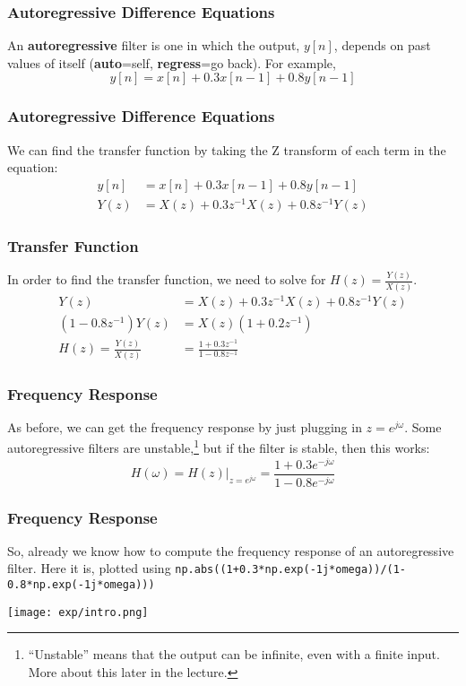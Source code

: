 \documentclass{beamer}
\begin{document}
\begin{frame}
  \frametitle{Autoregressive Difference Equations}

  An {\bf autoregressive} filter is one in which the output, $y[n]$,
  depends on past values of itself ({\bf auto}=self, {\bf
    regress}=go back).  For example,
  \[
  y[n] = x[n] + 0.3x[n-1] + 0.8 y[n-1]
  \]
  
\end{frame}

\begin{frame}
  \frametitle{Autoregressive Difference Equations}

  We can find the transfer function by taking the Z transform of each term
  in the equation:
  \begin{align*}
    y[n] &= x[n] + 0.3 x[n-1] +  0.8 y[n-1]\\
    Y(z) &= X(z) + 0.3z^{-1}X(z) + 0.8  z^{-1}Y(z)
  \end{align*}
  
\end{frame}

\begin{frame}
  \frametitle{Transfer Function}

  In order to find the transfer function, we need to solve for
  $H(z)=\frac{Y(z)}{X(z)}$.
  \begin{align*}
    Y(z) &= X(z) + 0.3z^{-1}X(z) + 0.8 z^{-1}Y(z)\\
    \left(1-0.8z^{-1}\right)Y(z) &= X(z)(1+0.2z^{-1})\\
    H(z) =\frac{Y(z)}{X(z)} &= \frac{1+0.3z^{-1}}{1-0.8 z^{-1}}
  \end{align*}
\end{frame}

\begin{frame}
  \frametitle{Frequency Response}

  As before, we can get the frequency response by just plugging in
  $z=e^{j\omega}$.  Some autoregressive filters are
  unstable,\footnote{``Unstable'' means that the output can be
    infinite, even with a finite input.  More about this later in the
    lecture.} but if the filter is stable, then this works:
  \[
  H(\omega) = H(z)\vert_{z=e^{j\omega}} = \frac{1+0.3e^{-j\omega}}{1-0.8 e^{-j\omega}}
  \]
\end{frame}

\begin{frame}
  \frametitle{Frequency Response}

  So, already we know how to compute the frequency response of an autoregressive filter.
  Here it is, plotted using {\tt np.abs((1+0.3*np.exp(-1j*omega))/(1-0.8*np.exp(-1j*omega)))}
  
  \centerline{\texttt{[image: exp/intro.png]}}
\end{frame}
\end{document}
